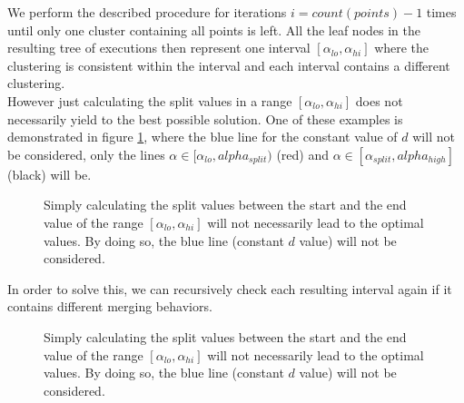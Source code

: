 We perform the described procedure for iterations $i = count(points) -1$ times until only one cluster containing all points is left. All the leaf nodes in the resulting tree of executions then represent one interval $[\alpha_{lo}, \alpha_{hi}]$ where the clustering is consistent within the interval and each interval contains a different clustering.\\

However just calculating the split values in a range $[\alpha_{lo}, \alpha_{hi}]$ does not necessarily yield to the best possible solution. One of these examples is demonstrated in figure \ref{fig:notoptimal}, where the blue line for the constant value of $d$ will not be considered, only the lines $\alpha \in [\alpha_{lo}, alpha_{split})$ (red) and $\alpha \in [\alpha_{split}, alpha_{high}]$ (black) will be.

\begin{figure}[h]
    \centering
    \caption{Simply calculating the split values between the start and the end value of the range $[\alpha_{lo}, \alpha_{hi}]$ will not necessarily lead to the optimal values. By doing so, the blue line (constant $d$ value) will not be considered.}
    \label{fig:notoptimal}
\end{figure}

In order to solve this, we can recursively check each resulting interval again if it contains different merging behaviors.

\begin{figure}[h]
    \centering
    \caption{Simply calculating the split values between the start and the end value of the range $[\alpha_{lo}, \alpha_{hi}]$ will not necessarily lead to the optimal values. By doing so, the blue line (constant $d$ value) will not be considered.}
    \label{fig:notoptimal2}
\end{figure}

